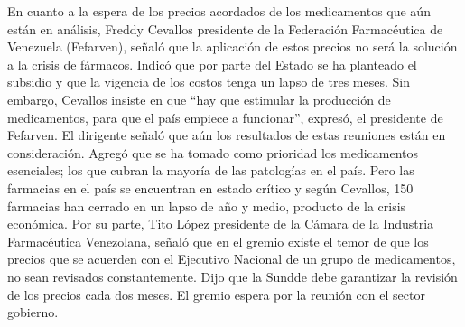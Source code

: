 \documentclass{article}%
\begin{document}
\newline%
%
En cuanto a la espera de los precios acordados de los medicamentos que aún están en análisis, Freddy Cevallos presidente de la Federación Farmacéutica de Venezuela (Fefarven), señaló que la aplicación de estos precios no será la solución a la crisis de fármacos.%
\newline%
%
Indicó que por parte del Estado se ha planteado el subsidio y que la vigencia de los costos tenga un lapso de tres meses.%
\newline%
%
Sin embargo, Cevallos insiste en que “hay que estimular la producción de medicamentos, para que el país empiece a funcionar”, expresó, el presidente de Fefarven.%
\newline%
%
El dirigente señaló que aún los resultados de estas reuniones están en consideración.%
\newline%
%
Agregó que se ha tomado como prioridad los medicamentos esenciales; los que cubran la mayoría de las patologías en el país.%
\newline%
%
Pero las farmacias en el país se encuentran en estado crítico y según Cevallos, 150 farmacias han cerrado en un lapso de año y medio, producto de la crisis económica.%
\newline%
%
Por su parte, Tito López presidente de la Cámara de la Industria Farmacéutica Venezolana, señaló que en el gremio existe el temor de que los precios que se acuerden con el Ejecutivo Nacional de un grupo de medicamentos, no sean revisados constantemente.%
\newline%
%
Dijo que la Sundde debe garantizar la revisión de los precios cada dos meses.%
\newline%
%
El gremio espera por la reunión con el sector gobierno.%
\newline%
%
\end{document}
